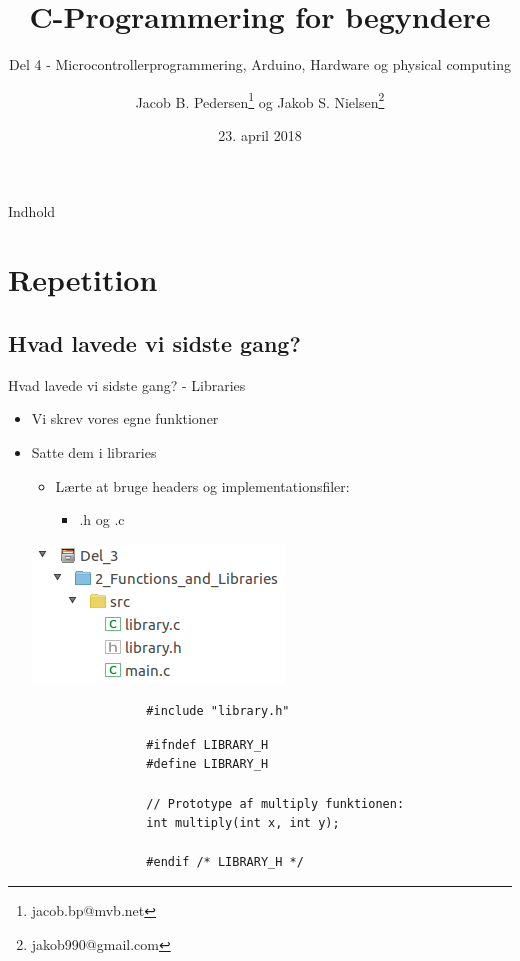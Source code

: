 \documentclass{beamer}
\title{C-Programmering for begyndere}
\date{23. april 2018}
\subtitle{Del 4 - Microcontrollerprogrammering, Arduino, Hardware og physical computing}
\author{Jacob B. Pedersen\footnote{jacob.bp@mvb.net} og Jakob S. Nielsen\footnote{jakob990@gmail.com}}
\begin{document}
\begin{frame}
	\maketitle
\end{frame}

\begin{frame}{Indhold}
	\tableofcontents
\end{frame}

\section{Repetition}
\subsection{Hvad lavede vi sidste gang?}

\begin{frame}[fragile]{Hvad lavede vi sidste gang? - Libraries}
	\begin{itemize}
		\item{Vi skrev vores egne funktioner}
		\item{Satte dem i libraries}
		\begin{itemize}
			\item{Lærte at bruge headers og implementationsfiler:}
			\begin{itemize}
				\item{{\color{dkgreen}.h} og {\color{dkgreen}.c}}
			\end{itemize}
		\end{itemize}
			\begin{center}
				\includegraphics[height=0.2\textheight]{assets/libraries.png}
			\end{center}
			\begin{lstlisting}
				#include "library.h"
			\end{lstlisting}
			\begin{lstlisting}
				#ifndef LIBRARY_H
				#define LIBRARY_H

				// Prototype af multiply funktionen:
				int multiply(int x, int y);

				#endif /* LIBRARY_H */
			\end{lstlisting}
	\end{itemize}
\end{frame}
\end{document}
